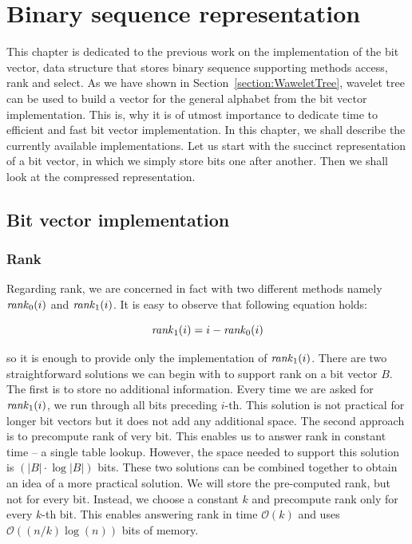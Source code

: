 \chapter{Binary sequence representation}
\label{kap:kap2}

This chapter is dedicated to the previous work on the implementation of the bit vector, data
structure that stores binary sequence supporting methods access, rank and select. As we have
shown in Section~\ref{section:WaweletTree}, wavelet tree can be used to build a vector
for the general alphabet from the bit vector implementation. This is, why it is of utmost
importance to dedicate time to efficient and fast bit vector implementation. In this
chapter, we shall describe the currently available implementations. Let us start with
the succinct representation of a bit vector, in which we simply store bits one after another.
Then we shall look at the compressed representation.

\section{Bit vector implementation}

\subsection{Rank}
\label{section:rank}

Regarding rank, we are concerned in fact with two different methods namely $\mathit{rank}_0(i)$ and
$\mathit{rank}_1(i)$. It is easy to observe that following equation holds:

                    $$\mathit{rank}_1(i) = i - \mathit{rank}_0(i)$$

so it is enough to provide only the implementation of $\mathit{rank}_1(i)$.
There are two straightforward solutions we can begin with to support rank on a bit vector
$B$. The first is to store no additional information. Every time we are asked
for $\mathit{rank}_1(i)$, we run through all bits preceding $i$-th. This solution is not
practical for longer bit vectors but it does not add any additional space. The second
approach is to precompute rank of very bit. This enables us to answer rank in constant
time -- a single table lookup. However, the space needed to support this
solution is $(|B|\cdot\log |B|)$ bits. These two solutions can be combined together to obtain an
idea of a more practical solution. We will store the pre-computed rank, but not for every
bit. Instead, we choose a constant $k$ and precompute rank only for every $k$-th bit. This
enables answering rank in time $\mathcal{O}(k)$ and uses $\mathcal{O}((n/k)\log(n))$ bits of
memory.

